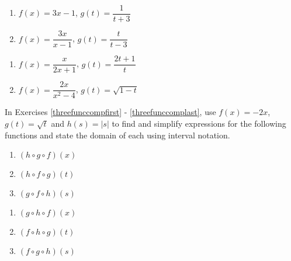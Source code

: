 \begin{multicols}{2}
\begin{enumerate}
\setcounter{enumi}{\value{HW}}

\item  $f(x) = 3x-1$, $g(t) = \dfrac{1}{t+3}$
\item  $f(x) = \dfrac{3x}{x-1}$, $g(t) =\dfrac{t}{t-3}$

\setcounter{HW}{\value{enumi}}
\end{enumerate}
\end{multicols}

\begin{multicols}{2}
\begin{enumerate}
\setcounter{enumi}{\value{HW}}

\item  $f(x) = \dfrac{x}{2x+1}$, $g(t) = \dfrac{2t+1}{t}$
\item  $f(x) =  \dfrac{2x}{x^2-4}$, $g(t) =\sqrt{1-t}$ 
 \label{funccompexp1last}

\setcounter{HW}{\value{enumi}}
\end{enumerate}
\end{multicols}

\enlargethispage{0.5in}

In Exercises \ref{threefunccompfirst} - \ref{threefunccomplast}, use $f(x) = -2x$, $g(t) = \sqrt{t}$ and $h(s) = |s|$ to find and simplify expressions for the following functions and state the domain of each using interval notation.

\begin{multicols}{3}

\begin{enumerate}
\setcounter{enumi}{\value{HW}}

\item $(h\circ g \circ f)(x)$ \label{threefunccompfirst}

\item $(h\circ f \circ g)(t)$

\item $(g\circ f \circ h)(s)$

\setcounter{HW}{\value{enumi}}
\end{enumerate}
\end{multicols}

\begin{multicols}{3}
\begin{enumerate}
\setcounter{enumi}{\value{HW}}

\item $(g\circ h \circ f)(x)$ 

\item $(f\circ h \circ g)(t)$

\item $(f\circ g \circ h)(s)$ \label{threefunccomplast}

\setcounter{HW}{\value{enumi}}
\end{enumerate}
\end{multicols}

